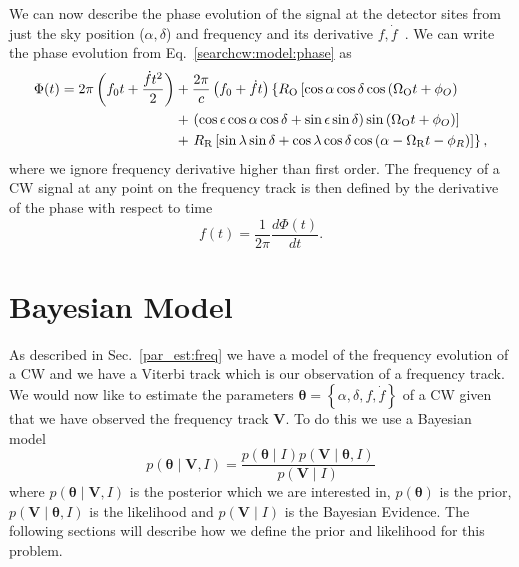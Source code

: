 We can now describe the phase evolution of the signal at the detector
sites from just the sky
position ($\alpha, \delta$) and frequency and its derivative
$f,\dot{f}$~.  We can write the phase evolution from Eq.~\ref{searchcw:model:phase} as
%
\begin{equation}
    \label{par_est:freq:ph_evolution}
    \begin{split}
        \Phi(t) = 2\pi \left(  f_0 t + \frac{\dot{f} t^2}{2} \right) &+ \frac{2\pi}{c} \left(  f_0 + \dot{f}t  \right) \left\{ R_{\rm{O}} \left[ \cos \alpha \cos \delta \cos \left( \Omega_{\mathrm{O}} t + \phi_{O}  \right) \right. \right. \\ 
        &+ \left. \left( \cos \epsilon \cos \alpha \cos \delta +  \sin \epsilon \sin \delta \right) \sin \left( \Omega_{\mathrm{O}} t + \phi_{O}  \right) \right] \\
        &+ \left. R_{\rm{R}} \left[ \sin \lambda \sin \delta + \cos \lambda \cos \delta \cos \left( \alpha - \Omega_{\mathrm{R}} t - \phi_{R}  \right)     \right] \right\},
    \end{split}
\end{equation}
%
where we ignore frequency derivative higher than first order.
The frequency of a \gls{CW} signal at any point on the frequency track is then defined by the derivative of
the phase with respect to time~
%
\begin{equation}
f(t) = \frac{1}{2\pi}\frac{d\Phi(t)}{dt}.
\end{equation}

%
%
\section{\label{par_est:bayes}Bayesian Model}
%
%

As described in Sec.~\ref{par_est:freq} we have a model of the frequency
evolution of a \gls{CW} and we have a Viterbi track which is our observation of
a frequency track.  We would now like to estimate the parameters $\bm{\theta} =
\left\{\alpha, \delta, f, \dot{f} \right\}$ of a \gls{CW} given that we have
observed the frequency track $\bm{V}$.  To do this we use a Bayesian model
%
\begin{equation}
    \label{par_est:bayes:eqn}
    p(\bm{\theta} \mid \bm{V}, I) = \frac{p(\bm{\theta} \mid I) p(\bm{V} \mid \bm{\theta}, I)}{p(\bm{V} \mid I)}
\end{equation}
%
where $p(\bm{\theta} \mid \bm{V}, I)$ is the posterior which we are interested in,
$p(\bm{\theta})$ is the prior, $p(\bm{V} \mid \bm{\theta}, I)$ is the
likelihood and $p(\bm{V} \mid I)$ is the Bayesian Evidence. The
following sections will describe how we define the prior and likelihood for
this problem.

